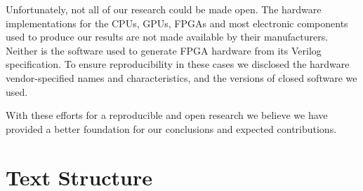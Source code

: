 Unfortunately, not all of our research could be made open. The hardware
implementations for the CPUs, GPUs, FPGAs and most electronic components used
to produce our results are not made available by their manufacturers. Neither
is the software used to generate FPGA hardware from its Verilog specification.
To ensure reproducibility in these cases we disclosed the hardware
vendor-specified names and characteristics, and the versions of closed software
we used.

With these efforts for a reproducible and open research we believe we have
provided a better foundation for our conclusions and expected contributions.

\section{Text Structure}
\label{sec:org}
